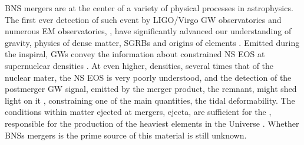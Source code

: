 %
%


\ac{BNS} mergers are at the center of a variety of physical processes in astrophysics.
The first ever detection of such event by \ac{LIGO}/Virgo \ac{GW} observatories and 
numerous \ac{EM} observatories, \GW{}, have significantly advanced our understanding 
of gravity, physics of dense matter, \acp{SGRB} and origins of \rproc{} elements 
\cite{TheLIGOScientific:2017qsa,Abbott:2018wiz,GBM:2017lvd}. 
%
Emitted during the inspiral, \acp{GW} convey the information about  
constrained \ac{NS} \ac{EOS} at supernuclear densities \cite{Hinderer:2009ca,Damour:2012yf,DelPozzo:2013ala}. At even higher, 
densities, several times that of the nuclear mater, the \ac{NS} \ac{EOS} is very 
poorly understood, and the detection of the postmerger \ac{GW} signal, 
emitted by the merger product, the remnant, might shed light on it \cite{Sekiguchi:2011mc,Radice:2017lry,Most:2018eaw,Bauswein:2018bma}, 
constraining one of the main quantities, the tidal deformability.
%
The conditions within matter ejected at mergers, ejecta, are sufficient for the \rproc{} 
\nuc{}, responsible for the production of the heaviest elements in the Universe
\cite{Cowan:2019pkx}.
Whether \acp{BNS} mergers is the prime source of this material is still unknown.

